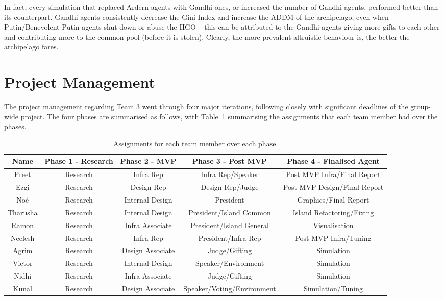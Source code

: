 \documentclass{article}
\begin{document}
In fact, every simulation that replaced Ardern agents with Gandhi ones, or increased the number of Gandhi agents, performed better than its counterpart. Gandhi agents consistently decrease the Gini Index and increase the ADDM of the archipelago, even when Putin/Benevolent Putin agents shut down or abuse the IIGO -- this can be attributed to the Gandhi agents giving more gifts to each other and contributing more to the common pool (before it is stolen). Clearly, the more prevalent altruistic behaviour is, the better the archipelago fares. 


\section{Project Management}
\label{sec:management}

The project management regarding Team 3 went through four major iterations, following closely with significant deadlines of the group-wide project. The four phases are summarised as follows, with Table~\ref{tab:phase_jobs} summarising the assignments that each team member had over the phases.

\begin {table} [h]
\begin{center}
\begin{adjustbox}{max width=1.1\textwidth,center}
\begin{tabular}{|c||c c c c|}
    \hline
    Name & Phase 1 - Research & Phase 2 - MVP & Phase 3 - Post MVP & Phase 4 - Finalised Agent\\ \hline \hline
    Preet & Research & Infra Rep & Infra Rep/Speaker & Post MVP Infra/Final Report \\ \hline
    Ezgi & Research & Design Rep & Design Rep/Judge & Post MVP Design/Final Report \\ \hline
    Noé & Research & Internal Design & President & Graphics/Final Report \\ \hline
    Tharusha & Research & Internal Design & President/Island Common & Island Refactoring/Fixing \\ \hline
    Ramon & Research & Infra Associate & President/Island General & Visualisation  \\ \hline
    Neelesh & Research & Infra Rep & President/Infra Rep & Post MVP Infra/Tuning \\ \hline
    Agrim & Research & Design Associate & Judge/Gifting & Simulation \\ \hline
    Victor & Research & Internal Design & Speaker/Environment & Simulation \\ \hline
    Nidhi & Research & Infra Associate & Judge/Gifting & Simulation \\ \hline
    Kunal & Research & Design Associate & Speaker/Voting/Environment & Simulation/Tuning \\ 
    \hline
\end{tabular}
\end{adjustbox}
\end{center}
\label{tab:phase_jobs}
\caption{Assignments for each team member over each phase.}
\end{table}
\end{document}
